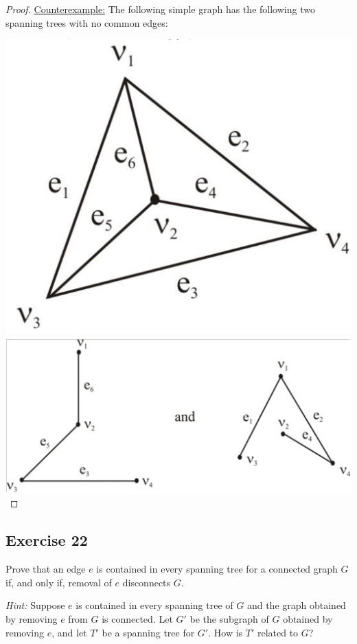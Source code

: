 \documentclass[14pt]{extarticle}
\begin{document}
\begin{proof}
\underline{Counterexample:} The following simple graph has the following two spanning trees with no common edges:

\includegraphics[scale=0.15]{../images/10.6.21.b.1.png}
\includegraphics[scale=0.25]{../images/10.6.21.b.2.png}
\end{proof}

\subsection{Exercise 22}
Prove that an edge \(e\) is contained in every spanning tree for a connected graph \(G\) if, and only if, removal of \(e\) 
disconnects \(G\).

{\it Hint:} Suppose \(e\) is contained in every spanning tree of \(G\) and the graph obtained by removing \(e\) from \(G\) 
is connected. Let \(G'\) be the subgraph of \(G\) obtained by removing \(e\), and let \(T'\) be a spanning tree for \(G'\). 
How is \(T'\) related to \(G\)?
\end{document}
